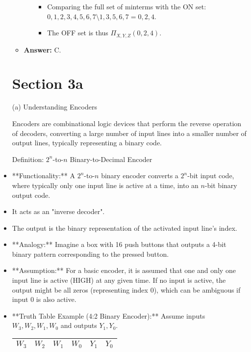 \documentclass{article}
\begin{document}
\begin{itemize}
\begin{itemize}
\begin{enumerate}
                \begin{itemize}
                    \item Comparing the full set of minterms with the ON set: ${0, 1, 2, 3, 4, 5, 6, 7} \setminus {1, 3, 5, 6, 7} = {0, 2, 4}$.
                    \item The OFF set is thus $\Pi_{X,Y,Z}(0,2,4)$.
                \end{itemize}
        \end{enumerate}

    \item \textbf{Answer:} C.
\end{itemize}



\section{Section 3a}

(a) Understanding Encoders

Encoders are combinational logic devices that perform the reverse operation of decoders, converting a large number of input lines into a smaller number of output lines, typically representing a binary code.

Definition: $2^n$-to-$n$ Binary-to-Decimal Encoder

\item **Functionality:** A $2^n$-to-$n$ binary encoder converts a $2^n$-bit input code, where typically only one input line is active at a time, into an $n$-bit binary output code.

    \item It acts as an "inverse decoder".

    \item The output is the binary representation of the activated input line's index.

    \item **Analogy:** Imagine a box with 16 push buttons that outputs a 4-bit binary pattern corresponding to the pressed button.

\item **Assumption:** For a basic encoder, it is assumed that one and only one input line is active (HIGH) at any given time. If no input is active, the output might be all zeros (representing index 0), which can be ambiguous if input 0 is also active.

\item **Truth Table Example (4:2 Binary Encoder):** Assume inputs $W_3, W_2, W_1, W_0$ and outputs $Y_1, Y_0$. \begin{tabular}{|cccc|cc|} \\ \hline
 $W_3$ & $W_2$ & $W_1$ & $W_0$ & $Y_1$ & $Y_0$ \\ \hline


\end{tabular}
\end{itemize}
\end{document}
